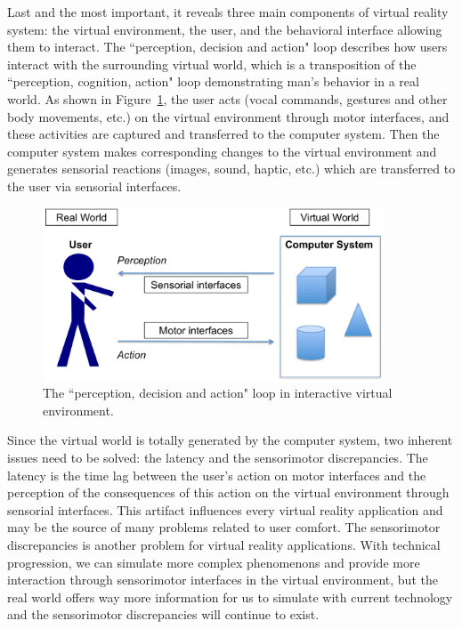 Last and the most important, it reveals three main components of virtual reality system: the virtual environment, the user, and the behavioral interface allowing them to interact. The ``perception, decision and action" loop \citep{Fuchs2011Book} describes how users interact with the surrounding virtual world, which is a transposition of the ``perception, cognition, action" loop demonstrating man's behavior in a real world. As shown in Figure~\ref{fig:1_loop}, the user acts (vocal commands, gestures and other body movements, etc.) on the virtual environment through motor interfaces, and these activities are captured and transferred to the computer system. Then the computer system makes corresponding changes to the virtual environment and generates sensorial reactions (images, sound, haptic, etc.) which are transferred to the user via sensorial interfaces.

\begin{figure}[htb]
  \centering
  \includegraphics[width=0.9\textwidth]{figures/ch1/loop}
  \caption{\label{fig:1_loop}The ``perception, decision and action" loop in interactive virtual environment.}
\end{figure}

Since the virtual world is totally generated by the computer system, two inherent issues need to be solved: the latency and the sensorimotor discrepancies. The latency is the time lag between the user's action on motor interfaces and the perception of the consequences of this action on the virtual environment through sensorial interfaces. This artifact influences every virtual reality application and may be the source of many problems related to user comfort. The sensorimotor discrepancies is another problem for virtual reality applications. With technical progression, we can simulate more complex phenomenons and provide more interaction through sensorimotor interfaces in the virtual environment, but the real world offers way more information for us to simulate with current technology and the sensorimotor discrepancies will continue to exist.

